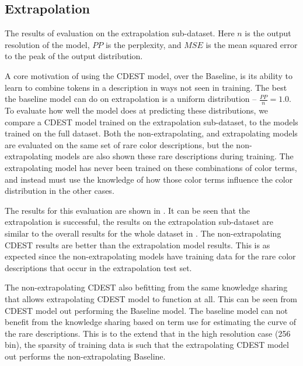\documentclass[11pt,letterpaper]{article}
\begin{document}
\subsection{Extrapolation}

\begin{table*}
	\centering
	\caption{\label{tblresextrapo} The results of evaluation on the extrapolation sub-dataset. Here $n$ is the output resolution of the model, $PP$ is the perplexity, and $MSE$ is the mean squared error to the peak of the output distribution.}
\end{table*}


A core motivation of using the CDEST model, over the Baseline, is its ability to learn to combine tokens in a description in ways not seen in training.
The best the baseline model can do on extrapolation is a uniform distribution -- $\frac{PP}{n}=1.0$.
To evaluate how well the model does at predicting these distributions,
we compare a CDEST model trained on the extrapolation sub-dataset, to the models trained on the full dataset.
Both the non-extrapolating, and extrapolating models are evaluated on the same set of rare color descriptions,
but the non-extrapolating models are also shown these rare descriptions during training.
The extrapolating model has never been trained on these combinations of color terms,
and instead must use the knowledge of how those color terms influence the color distribution in the other cases.

The results for this evaluation are shown in .
It can be seen that the extrapolation is successful, the results on the extrapolation sub-dataset are similar to the overall results for the whole dataset in .
The non-extrapolating CDEST results are better than the extrapolation model results.
This is as expected since the non-extrapolating models have training data for the rare color descriptions that occur in the extrapolation test set.

The non-extrapolating CDEST also befitting from the same knowledge sharing that allows extrapolating CDEST model to function at all.
This can be seen from CDEST model out performing the Baseline model.
The baseline model can not benefit from the knowledge sharing based on term use for estimating the curve of the rare descriptions.
This is to the extend that in the high resolution case (256 bin),
the sparsity of training data is such that the extrapolating CDEST model out performs the non-extrapolating Baseline.
\end{document}
